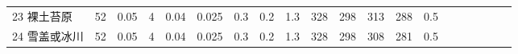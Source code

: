 \begin{sidewaystable}[]
\begin{tabular}{@{}lccccccccccccccccccc@{}}
    23 裸土苔原    & 52                                                                & 0.05                                                                                                   & 4                                                                                  & 0.04                                                                               & 0.025                                                               & 0.3                                                       & 0.2                                                       & 1.3                                                       & 328                                                             & 298                                                             & 313                                                              & 288                                                               & 0.5                                                          \\
    24 雪盖或冰川   & 52                                                                & 0.05                                                                                                   & 4                                                                                  & 0.04                                                                               & 0.025                                                               & 0.3                                                       & 0.2                                                       & 1.3                                                       & 328                                                             & 298                                                             & 308                                                              & 281                                                               & 0.5                                                          \\\bottomrule
    \end{tabular}
\end{sidewaystable}


